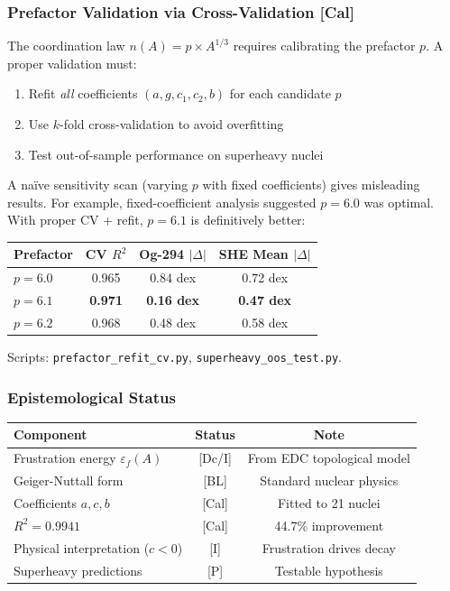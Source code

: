 \subsubsection{Prefactor Validation via Cross-Validation [Cal]}

The coordination law $n(A) = p \times A^{1/3}$ requires calibrating the prefactor $p$. A proper validation must:
\begin{enumerate}
    \item Refit \emph{all} coefficients $(a, g, c_1, c_2, b)$ for each candidate $p$
    \item Use $k$-fold cross-validation to avoid overfitting
    \item Test out-of-sample performance on superheavy nuclei
\end{enumerate}

\begin{tcolorbox}[colback=yellow!5!white, colframe=yellow!75!black, title=Lesson Learned: Always Refit with CV]
A na\"ive sensitivity scan (varying $p$ with fixed coefficients) gives misleading results. For example, fixed-coefficient analysis suggested $p = 6.0$ was optimal. With proper CV + refit, $p = 6.1$ is definitively better:

\begin{center}
\begin{tabular}{lccc}
\hline
Prefactor & CV $R^2$ & Og-294 $|\Delta|$ & SHE Mean $|\Delta|$ \\
\hline
$p = 6.0$ & 0.965 & 0.84 dex & 0.72 dex \\
$p = 6.1$ & \textbf{0.971} & \textbf{0.16 dex} & \textbf{0.47 dex} \\
$p = 6.2$ & 0.968 & 0.48 dex & 0.58 dex \\
\hline
\end{tabular}
\end{center}

Scripts: \texttt{prefactor\_refit\_cv.py}, \texttt{superheavy\_oos\_test.py}.
\end{tcolorbox}

\subsubsection{Epistemological Status}

\begin{center}
\begin{tabular}{lcc}
\hline
\textbf{Component} & \textbf{Status} & \textbf{Note} \\
\hline
Frustration energy $\varepsilon_f(A)$ & [Dc/I] & From EDC topological model \\
Geiger-Nuttall form & [BL] & Standard nuclear physics \\
Coefficients $a, c, b$ & [Cal] & Fitted to 21 nuclei \\
$R^2 = 0.9941$ & [Cal] & 44.7\% improvement \\
Physical interpretation ($c < 0$) & [I] & Frustration drives decay \\
Superheavy predictions & [P] & Testable hypothesis \\
\hline
\end{tabular}
\end{center}

